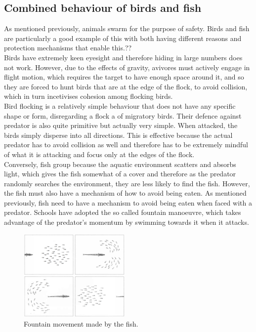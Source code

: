 \documentclass[
reprint,
showpacs,preprintnumbers,
amsmath,amssymb,
prl,
]{revtex4-1}
\begin{document}
\subsection{\label{sec:level2}Combined behaviour of birds and fish}
As mentioned previously, animals swarm for the purpose of safety. Birds and fish are particularly a good example of this with both having different reasons and protection mechanisms that enable this.??\\
\indent Birds have extremely keen eyesight and therefore hiding in large numbers does not work. However, due to the effects of gravity, avivores must actively engage in flight motion, which requires the target to have enough space around it, and so they are forced to hunt birds that are at the edge of the flock, to avoid collision, which in turn incetivises cohesion among flocking birds.\\
\indent Bird flocking is a relatively simple behaviour that does not have any specific shape or form, disregarding a flock a of migratory birds. Their defence against predator is also quite primitive but actually very simple. When attacked, the birds simply disperse into all directions. This is effective because the actual predator has to avoid collision as well and therefore has to be extremely mindful of what it is attacking and focus only at the edges of the flock.\\
\indent Conversely, fish group because the aquatic environment scatters and absorbs light, which gives the fish somewhat of a cover and therefore as the predator randomly searches the environment, they are less likely to find the fish. However, the fish must also have a mechanism of how to avoid being eaten. As mentioned previously, fish need to have a mechanism to avoid being eaten when faced with a predator. Schools have adopted the so called fountain manoeuvre, which takes advantage of the predator's momentum by swimming towards it when it attacks. 

\begin{figure}[!htp]
	\includegraphics[width=0.48\textwidth]{images/partridgeFountain.png}

	\caption{
		Fountain movement made by the fish.
	}

	\label{fig:boidleader}
\end{figure}
\end{document}
